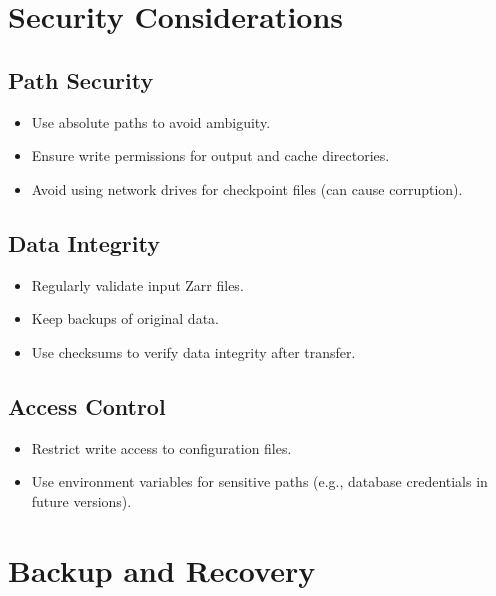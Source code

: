 \documentclass[12pt,a4paper]{article}
\begin{document}
\section{Security Considerations}

\subsection{Path Security}
\begin{itemize}
    \item Use absolute paths to avoid ambiguity.
    \item Ensure write permissions for output and cache directories.
    \item Avoid using network drives for checkpoint files (can cause corruption).
\end{itemize}

\subsection{Data Integrity}
\begin{itemize}
    \item Regularly validate input Zarr files.
    \item Keep backups of original data.
    \item Use checksums to verify data integrity after transfer.
\end{itemize}

\subsection{Access Control}
\begin{itemize}
    \item Restrict write access to configuration files.
    \item Use environment variables for sensitive paths (e.g., database credentials in future versions).
\end{itemize}

\section{Backup and Recovery}
\end{document}
